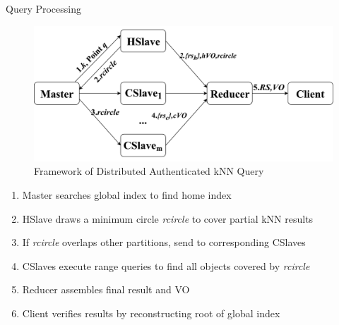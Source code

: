 \documentclass[xcolor={dvipsnames},aspectratio=169,10pt]{beamer}
\begin{document}
\begin{frame}{Query Processing}
  \begin{figure}
    \includegraphics[width=.6\linewidth]{figs/knn/framework.pdf}
    \caption{Framework of Distributed Authenticated kNN Query}
  \end{figure}
  \vspace{-2ex}
  \begin{enumerate}[<+->]
    \item Master searches global index to find \alert{home index}
    \item HSlave draws a minimum circle \alert{\emph{rcircle}} to cover partial kNN results
    \item If \emph{rcircle} overlaps other partitions, send to corresponding CSlaves
    \item CSlaves execute \alert{range queries} to find all objects covered by \emph{rcircle}
    \item Reducer assembles final result and VO
    \item Client verifies results by reconstructing root of global index
  \end{enumerate}
\end{frame}
\end{document}
